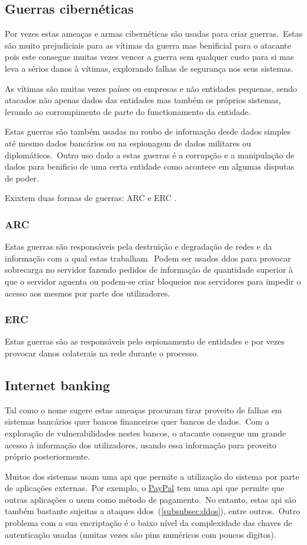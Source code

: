 \documentclass{report}
\begin{document}
\subsection{Guerras cibernéticas}
Por vezes estas ameaças e armas cibernéticas são usadas para criar guerras.\ Estas são muito prejudiciais para as vítimas da guerra mas benificial para o atacante pois este consegue muitas vezes vencer a guerra sem qualquer custo para si mas leva a sérios danos à vítimas, explorando falhas de segurança nos seus sistemas.
\par As vítimas são muitas vezes países ou empresas e não entidades pequenas, sendo atacados não apenas dados das entidades mas também os próprios sistemas, levando ao corrompimento de parte do functionamento da entidade.
\par Estas guerras são também usadas no roubo de informação desde dados simples até mesmo dados bancários ou na espionagem de dados militares ou diplomáticos.\ Outro uso dado a estas guerras é a corrupção e a manipulação de dados para benificio de uma certa entidade como acontece em algumas disputas de poder.
\par Exixtem duas formas de guerras: ARC e ERC .

\subsubsection{ARC}
Estas guerras são responsáveis pela destruição e degradação de redes e da informação com a qual estas trabalham.\ Podem ser usados \ac{ddos} para provocar sobrecarga no servidor fazendo pedidos de informação de quantidade superior à que o servidor aguenta ou podem-se criar bloqueios nos servidores para impedir o acesso aos mesmos por parte dos utilizadores.
\subsubsection{ERC}
Estas guerras são as responsáveis pelo espionamento de entidades e por vezes provocar danos colaterais na rede durante o processo.

\subsection{Internet banking}
Tal como o nome sugere estas ameaças procuram tirar proveito de falhas em sistemas bancários quer bancos financeiros quer bancos de dados.\ Com a exploração de vulnerabilidades nestes bancos, o atacante consegue um grande acesso à informação dos utilizadores, usando essa informação para proveito próprio posteriormente.
\par Muitos dos sistemas usam uma \ac{api} que permite a utilização do sistema por parte de aplicações externas.\ Por exemplo, o \href{https://www.paypal.com/}{PayPal} tem uma \ac{api} que permite que outras aplicações o usem como método de pagamento.\ No entanto, estas \ac{api} são também bastante sujeitas a ataques \ac{ddos}~(\ref{subsubsec:ddos}), entre outros.\ Outro problema com a sua encriptação é o baixo nível da complexidade das chaves de autenticação usadas (muitas vezes são pins numéricos com poucos digitos).
\end{document}
